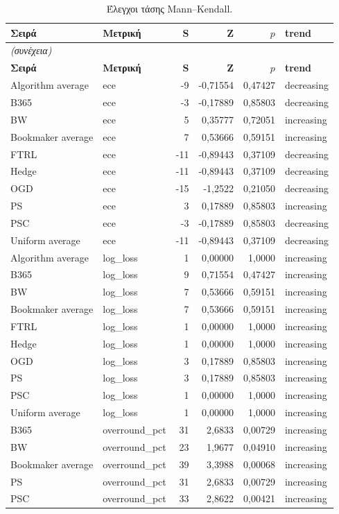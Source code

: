 {\small
\begin{longtable}{@{}llrrrl@{}}
\caption{Έλεγχοι τάσης Mann--Kendall.}\label{app:mk}\\
\toprule \textbf{Σειρά} & \textbf{Μετρική} & \textbf{S} & \textbf{Z} & \textbf{$p$} & \textbf{trend} \\\midrule\endfirsthead
\multicolumn{6}{l}{\emph{(συνέχεια)}}\\\toprule \textbf{Σειρά} & \textbf{Μετρική} & \textbf{S} & \textbf{Z} & \textbf{$p$} & \textbf{trend} \\\midrule\endhead
\bottomrule\endfoot
Algorithm average & ece & -9 & -0,71554 & 0,47427 & decreasing \\
B365 & ece & -3 & -0,17889 & 0,85803 & decreasing \\
BW & ece & 5 & 0,35777 & 0,72051 & increasing \\
Bookmaker average & ece & 7 & 0,53666 & 0,59151 & increasing \\
FTRL & ece & -11 & -0,89443 & 0,37109 & decreasing \\
Hedge & ece & -11 & -0,89443 & 0,37109 & decreasing \\
OGD & ece & -15 & -1,2522 & 0,21050 & decreasing \\
PS & ece & 3 & 0,17889 & 0,85803 & increasing \\
PSC & ece & -3 & -0,17889 & 0,85803 & decreasing \\
Uniform average & ece & -11 & -0,89443 & 0,37109 & decreasing \\
Algorithm average & log\_loss & 1 & 0,00000 & 1,0000 & increasing \\
B365 & log\_loss & 9 & 0,71554 & 0,47427 & increasing \\
BW & log\_loss & 7 & 0,53666 & 0,59151 & increasing \\
Bookmaker average & log\_loss & 7 & 0,53666 & 0,59151 & increasing \\
FTRL & log\_loss & 1 & 0,00000 & 1,0000 & increasing \\
Hedge & log\_loss & 1 & 0,00000 & 1,0000 & increasing \\
OGD & log\_loss & 3 & 0,17889 & 0,85803 & increasing \\
PS & log\_loss & 3 & 0,17889 & 0,85803 & increasing \\
PSC & log\_loss & 1 & 0,00000 & 1,0000 & increasing \\
Uniform average & log\_loss & 1 & 0,00000 & 1,0000 & increasing \\
B365 & overround\_pct & 31 & 2,6833 & 0,00729 & increasing \\
BW & overround\_pct & 23 & 1,9677 & 0,04910 & increasing \\
Bookmaker average & overround\_pct & 39 & 3,3988 & 0,00068 & increasing \\
PS & overround\_pct & 31 & 2,6833 & 0,00729 & increasing \\
PSC & overround\_pct & 33 & 2,8622 & 0,00421 & increasing \\
\end{longtable}
}

